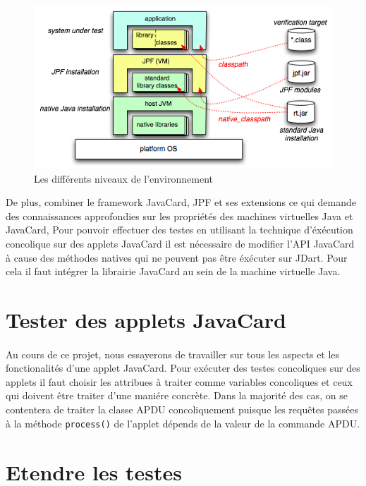 			\begin{figure}[H]
				\centering
					\includegraphics[scale=0.5]{images/layersJDart.png}
				\caption{\label{fig:jdart_layers} Les différents niveaux de l'environnement }
			\end{figure}
			
			De plus, combiner le framework JavaCard, \gls{JPF} et ses extensions ce qui demande des connaissances approfondies sur les propriétés des machines virtuelles
			Java et JavaCard, Pour pouvoir effectuer des testes en utilisant la technique d'éxécution concolique sur des applets JavaCard
			il est nécessaire de modifier l'API JavaCard à cause des méthodes natives qui ne peuvent pas être éxécuter sur JDart.
			Pour cela il faut intégrer la librairie JavaCard au sein de la machine virtuelle Java.
			
	\section{Tester des applets JavaCard}
		\paragraph{}
			Au cours de ce projet, nous essayerons de travailler sur tous les aspects et les fonctionalités d'une applet JavaCard.
			Pour exécuter des testes concoliques sur des applets il faut choisir les attribues à traiter comme variables concoliques et ceux
			qui doivent être traiter d'une maniére concrète.
			Dans la majorité des cas, on se contentera de traiter la classe APDU concoliquement puisque les requêtes passées à la méthode \verb|process()|
			de l'applet dépends de la valeur de la commande APDU.
	\section{Etendre les testes}
